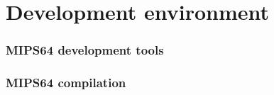 
%
%
%
%
%

%
%

\chapter{Development environment}

\subsection*{MIPS64 development tools}

\subsection*{MIPS64 compilation}
